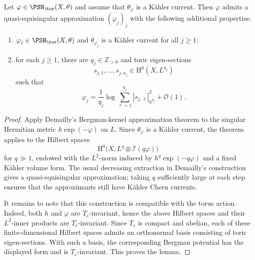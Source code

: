 \begin{lemma}\label{lma:toricBergmanapprox}
    Let $\varphi\in \PSH_{\tor}(X,\theta)$ and assume that $\theta_{\varphi}$ is a Kähler current. Then $\varphi$ admits a quasi-equisingular approximation $(\varphi_j)_j$ with the following additional properties:
    \begin{enumerate}
        \item\label{itm:lma:toricBergmanapprox:1} $\varphi_j\in \PSH_{\tor}(X,\theta)$ and $\theta_{\varphi_j}$ is a Kähler current for all $j\geq 1$;
        \item\label{itm:lma:toricBergmanapprox:2} for each $j\geq 1$, there are $q_j\in\mathbb Z_{>0}$ and toric eigen-sections
        \[
            s_{j,1},\ldots,s_{j,a_j}\in \mathrm{H}^0(X,L^{q_j})
        \]
        such that
        \[
            \varphi_j=\frac{1}{q_j}\log\sum_{\ell=1}^{a_j}|s_{j,\ell}|_{h^{q_j}}^2+\mathcal O(1).
        \]
    \end{enumerate}
\end{lemma}
\begin{proof}
    Apply Demailly's Bergman-kernel approximation theorem \cite[Theorem~13.21]{Dem12} to the singular Hermitian metric $h\exp(-\varphi)$ on $L$. Since $\theta_{\varphi}$ is a Kähler current, the theorem applies to the Hilbert spaces
    \[
        \mathrm{H}^0\bigl(X,L^q\otimes\mathcal I(q\varphi)\bigr)
    \]
    for $q\gg 1$, endowed with the $L^2$-norm induced by $h^q\exp(-q\varphi)$ and a fixed Kähler volume form. The usual decreasing extraction in Demailly's construction gives a quasi-equisingular approximation; taking $q$ sufficiently large at each step ensures that the approximants still have Kähler Chern currents.

    It remains to note that this construction is compatible with the torus action. Indeed, both $h$ and $\varphi$ are $T_c$-invariant, hence the above Hilbert spaces and their $L^2$-inner products are $T_c$-invariant. Since $T_c$ is compact and abelian, each of these finite-dimensional Hilbert spaces admits an orthonormal basis consisting of toric eigen-sections. With such a basis, the corresponding Bergman potential has the displayed form and is $T_c$-invariant. This proves the lemma.
\end{proof}


